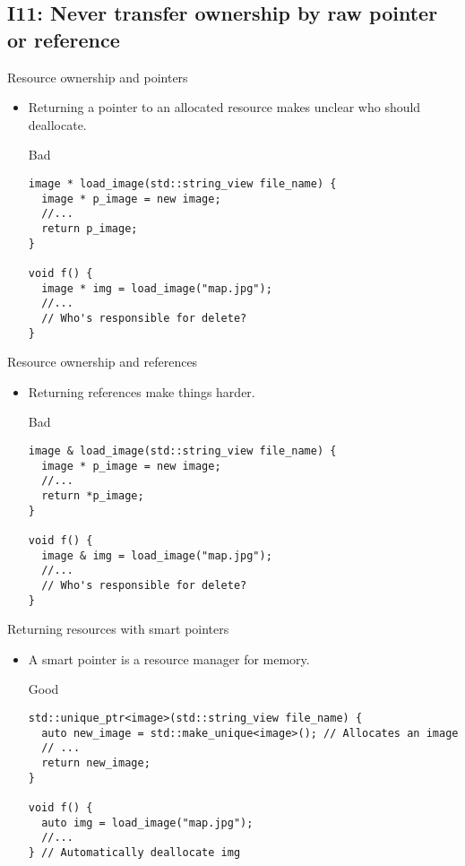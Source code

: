\subsection{I11: Never transfer ownership by raw pointer or reference}

\begin{frame}[t,fragile]{Resource ownership and pointers}
\begin{itemize}
  \item Returning a pointer to an allocated resource makes unclear who should
        deallocate.

\begin{block}{Bad}
\begin{lstlisting}
image * load_image(std::string_view file_name) {
  image * p_image = new image;
  //...
  return p_image;
}

void f() {
  image * img = load_image("map.jpg");
  //...
  // Who's responsible for delete?
}
\end{lstlisting}
\end{block}

\end{itemize}
\end{frame}

\begin{frame}[t,fragile]{Resource ownership and references}
\begin{itemize}
  \item Returning references make things harder.

\begin{block}{Bad}
\begin{lstlisting}
image & load_image(std::string_view file_name) {
  image * p_image = new image;
  //...
  return *p_image;
}

void f() {
  image & img = load_image("map.jpg");
  //...
  // Who's responsible for delete?
}
\end{lstlisting}
\end{block}
\end{itemize}
\end{frame}

\begin{frame}[t,fragile]{Returning resources with smart pointers}
\begin{itemize}
  \item A smart pointer is a resource manager for memory.

\begin{block}{Good}
\begin{lstlisting}
std::unique_ptr<image>(std::string_view file_name) {
  auto new_image = std::make_unique<image>(); // Allocates an image
  // ...
  return new_image;
}

void f() {
  auto img = load_image("map.jpg");
  //...
} // Automatically deallocate img
\end{lstlisting}
\end{block}
\end{itemize}
\end{frame}

